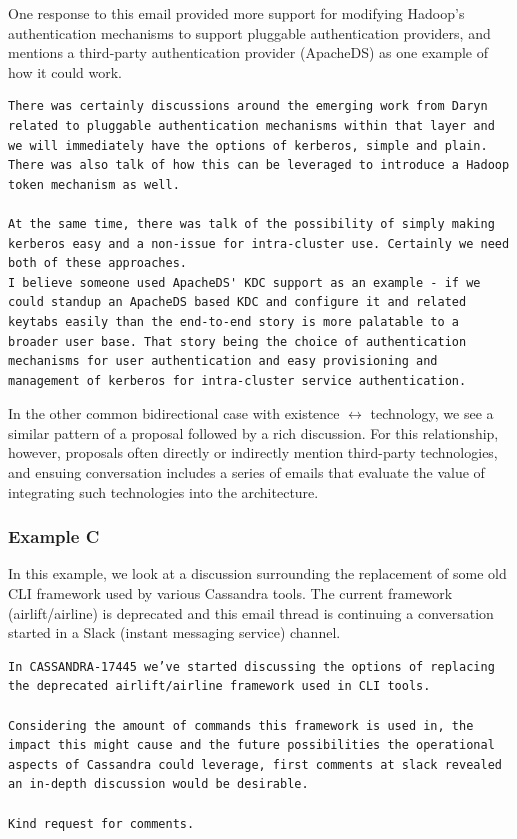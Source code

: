 \documentclass[a4paper, 12pt]{article}
\begin{document}
			One response to this email provided more support for modifying Hadoop's authentication mechanisms to support pluggable authentication providers, and mentions a third-party authentication provider (ApacheDS) as one example of how it could work.
			
			\begin{verbatim}
There was certainly discussions around the emerging work from Daryn related to pluggable authentication mechanisms within that layer and we will immediately have the options of kerberos, simple and plain. There was also talk of how this can be leveraged to introduce a Hadoop token mechanism as well. 

At the same time, there was talk of the possibility of simply making kerberos easy and a non-issue for intra-cluster use. Certainly we need both of these approaches.
I believe someone used ApacheDS' KDC support as an example - if we could standup an ApacheDS based KDC and configure it and related keytabs easily than the end-to-end story is more palatable to a broader user base. That story being the choice of authentication mechanisms for user authentication and easy provisioning and management of kerberos for intra-cluster service authentication.
			\end{verbatim}
		
	
		In the other common bidirectional case with existence $ \leftrightarrow $ technology, we see a similar pattern of a proposal followed by a rich discussion. For this relationship, however, proposals often directly or indirectly mention third-party technologies, and ensuing conversation includes a series of emails that evaluate the value of integrating such technologies into the architecture.
		
		\subsubsection{Example C}
			In this example, we look at a discussion surrounding the replacement of some old CLI framework used by various Cassandra tools. The current framework (airlift/airline) is deprecated and this email thread is continuing a conversation started in a Slack (instant messaging service) channel.
			
			\begin{verbatim}
In CASSANDRA-17445 we’ve started discussing the options of replacing the deprecated airlift/airline framework used in CLI tools.

Considering the amount of commands this framework is used in, the impact this might cause and the future possibilities the operational aspects of Cassandra could leverage, first comments at slack revealed an in-depth discussion would be desirable.

Kind request for comments.
			\end{verbatim}
		
\end{document}
